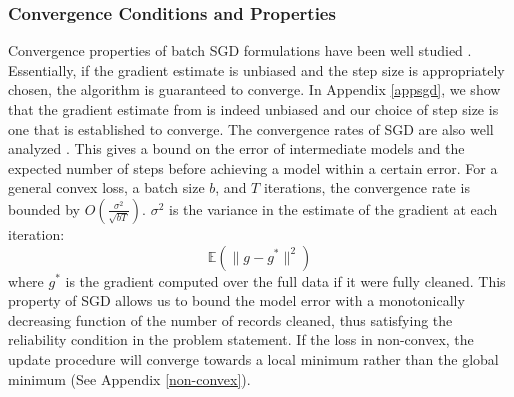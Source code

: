 \subsubsection{Convergence Conditions and Properties}
Convergence properties of batch SGD formulations have been well studied \cite{dekel2012optimal}. Essentially, if the gradient estimate is unbiased and the step size is appropriately chosen, the algorithm is guaranteed to converge. 
In Appendix \ref{appsgd}, we show that the gradient estimate from \sys is indeed unbiased and our choice of step size is one that is established to converge.
The convergence rates of SGD are also well analyzed \cite{dekel2012optimal,bertsekas2011incremental,zhao2014stochastic}. 
This gives a bound on the error of intermediate models and the expected number of steps before achieving a model within a certain error. 
For a general convex loss, a batch size $b$, and $T$ iterations, the convergence rate is bounded by $O(\frac{\sigma^2}{\sqrt{bT}})$. 
$\sigma^2$ is the variance in the estimate of the gradient at each iteration:
\[
\mathbb{E}(\|g - g^*\|^2)
\]
where $g^*$ is the gradient computed over the full data if it were fully cleaned.
This property of SGD allows us to bound the model error with a monotonically decreasing function of the number of records cleaned, thus satisfying the reliability condition in the problem statement.
If the loss in non-convex, the update procedure will converge towards a local minimum rather than the global minimum (See Appendix \ref{non-convex}).

